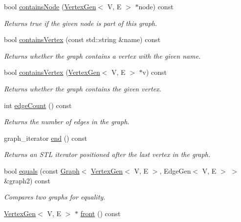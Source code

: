 \begin{DoxyCompactItemize}
bool \mbox{\hyperlink{classGraph_a4f540ebc07c4e46a0bb7fee76a93386c}{contains\+Node}} (\mbox{\hyperlink{classVertexGen}{Vertex\+Gen}}$<$ V, E $>$ $\ast$node) const
\begin{DoxyCompactList}\small\item\em Returns true if the given node is part of this graph. \end{DoxyCompactList}\item 
bool \mbox{\hyperlink{classBasicGraphGen_ab6062ac98f3491a525e0809c5b03b7cf}{contains\+Vertex}} (const std\+::string \&name) const
\begin{DoxyCompactList}\small\item\em Returns whether the graph contains a vertex with the given name. \end{DoxyCompactList}\item 
bool \mbox{\hyperlink{classBasicGraphGen_a37d4f31bc5bb6397fdb0bf966b54ca3f}{contains\+Vertex}} (\mbox{\hyperlink{classVertexGen}{Vertex\+Gen}}$<$ V, E $>$ $\ast$v) const
\begin{DoxyCompactList}\small\item\em Returns whether the graph contains the given vertex. \end{DoxyCompactList}\item 
int \mbox{\hyperlink{classBasicGraphGen_aa1f43093f29e66e171d5f572a658ae0c}{edge\+Count}} () const
\begin{DoxyCompactList}\small\item\em Returns the number of edges in the graph. \end{DoxyCompactList}\item 
graph\+\_\+iterator \mbox{\hyperlink{classGraph_afcdf62cae5d7e50644957d66f886742d}{end}} () const
\begin{DoxyCompactList}\small\item\em Returns an S\+TL iterator positioned after the last vertex in the graph. \end{DoxyCompactList}\item 
bool \mbox{\hyperlink{classGraph_a6bec43eb3dfdf3d23eb328b406edf44a}{equals}} (const \mbox{\hyperlink{classGraph}{Graph}}$<$ \mbox{\hyperlink{classVertexGen}{Vertex\+Gen}}$<$ V, E $>$, Edge\+Gen$<$ V, E $>$ $>$ \&graph2) const
\begin{DoxyCompactList}\small\item\em Compares two graphs for equality. \end{DoxyCompactList}\item 
\mbox{\hyperlink{classVertexGen}{Vertex\+Gen}}$<$ V, E $>$ $\ast$ \mbox{\hyperlink{classGraph_a7b7c2c1738f8e7faf84c54d7642992fa}{front}} () const

\end{DoxyCompactItemize}
